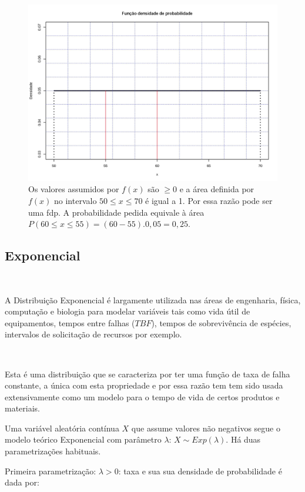 \documentclass[
]{book}
\begin{document}
\hfill\break

\begin{figure}

{\centering \includegraphics[width=0.6\linewidth]{images6/exerc_15} 

}

\caption{Os valores assumidos por $f(x)$ são $\ge 0$ e a área definida por $f(x)$ no intervalo $50 \le x \le 70$ é igual a 1. Por essa razão pode ser uma fdp. A probabilidade pedida equivale à área $P(60 \le x \le 55) = (60-55) .  0,05=0,25$.}\label{fig:fig22}
\end{figure}

\hfill\break

\hypertarget{exponencial}{%
\subsection{Exponencial}\label{exponencial}}

~

A Distribuição Exponencial é largamente utilizada nas áreas de engenharia, física, computação e biologia para modelar variáveis tais como vida útil de equipamentos, tempos entre falhas (\(TBF\)), tempos de sobrevivência de espécies, intervalos de solicitação de recursos por exemplo.

~

Esta é uma distribuição que se caracteriza por ter uma função de taxa de falha constante, a única com esta propriedade e por essa razão tem tem sido usada extensivamente como um modelo para o tempo de vida de certos produtos e materiais.

\hfill\break

Uma variável aleatória contínua \(X\) que assume valores não negativos segue o modelo teórico Exponencial com parâmetro \(\lambda\): \(X \sim Exp (\lambda)\). Há duas parametrizações habituais.

\hfill\break

Primeira parametrização: \(\lambda>0\): taxa e sua sua densidade de probabilidade é dada por:
\end{document}
